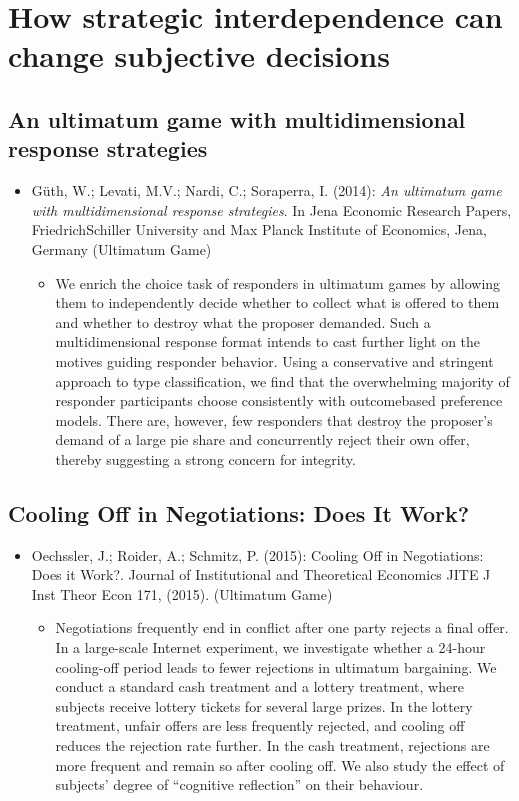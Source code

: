 
\chapter{How strategic interdependence can change subjective decisions}

\section{An ultimatum game with multidimensional response strategies} 

\begin{itemize}
	\item Güth, W.; Levati, M.V.; Nardi, C.; Soraperra, I. (2014): \textit{An ultimatum game with multidimensional response strategies}. In Jena Economic Research Papers, FriedrichSchiller University and Max Planck Institute of Economics, Jena, Germany (Ultimatum Game)
		\begin{itemize}
			\item We enrich the choice task of responders in ultimatum games by allowing them to independently decide whether to collect what is offered to them and whether to destroy what the proposer demanded. Such a multidimensional response format intends to cast further light on the motives guiding responder behavior. Using a conservative and stringent approach to type classification, we find that the overwhelming majority of responder participants choose consistently with outcomebased preference models. There are, however, few responders that destroy the proposer's demand of a large pie share and concurrently reject their own offer, thereby suggesting a strong concern for integrity.
		\end{itemize}
\end{itemize}
\vspace{-0.5cm}
\section{Cooling Off in Negotiations: Does It Work?}

\begin{itemize}
	\item Oechssler, J.; Roider, A.; Schmitz, P. (2015): Cooling Off in Negotiations: Does it Work?. Journal of Institutional and Theoretical Economics JITE J Inst Theor Econ 171, (2015). (Ultimatum Game)
		\begin{itemize}
			\item Negotiations frequently end in conflict after one party rejects a final offer. In a large-scale Internet experiment, we investigate whether a 24-hour cooling-off period leads to fewer rejections in ultimatum bargaining. We conduct a standard cash treatment and a lottery treatment, where subjects receive lottery tickets for several large prizes. In the lottery treatment, unfair offers are less frequently rejected, and cooling off reduces the rejection rate further. In the cash treatment, rejections are more frequent and remain so after cooling off. We also study the effect of subjects’ degree of “cognitive reflection” on their behaviour.
		\end{itemize}
\end{itemize}


